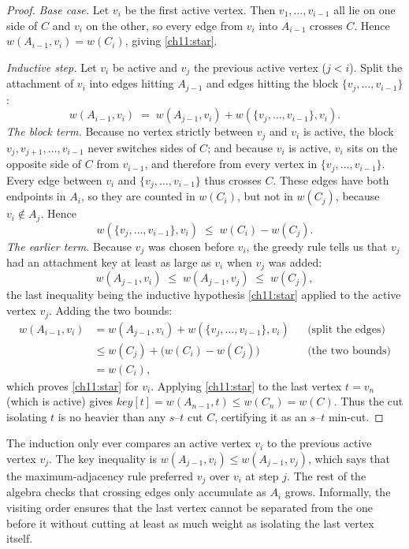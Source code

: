 \begin{proof}
\emph{Base case.} Let $v_i$ be the first active vertex. Then $v_1,\dots,v_{i-1}$ all lie on one side of $C$ and $v_i$ on the other, so every edge from $v_i$ into $A_{i-1}$ crosses $C$. Hence $w(A_{i-1},v_i)=w(C_i)$, giving \eqref{ch11:star}.

\emph{Inductive step.} Let $v_i$ be active and $v_j$ the previous active vertex ($j<i$). Split the attachment of $v_i$ into edges hitting $A_{j-1}$ and edges hitting the block $\{v_j,\dots,v_{i-1}\}$:
\[
  w(A_{i-1}, v_i) \;=\; w(A_{j-1}, v_i) + w(\{v_j,\dots,v_{i-1}\}, v_i).
\]
\emph{The block term.} Because no vertex strictly between $v_j$ and $v_i$ is active, the block $v_j,v_{j+1},\dots,v_{i-1}$ never switches sides of $C$; and because $v_i$ is active, $v_i$ sits on the opposite side of $C$ from $v_{i-1}$, and therefore from every vertex in $\{v_j,\dots,v_{i-1}\}$. Every edge between $v_i$ and $\{v_j,\dots,v_{i-1}\}$ thus crosses $C$. These edges have both endpoints in $A_i$, so they are counted in $w(C_i)$, but not in $w(C_j)$, because $v_i\notin A_j$. Hence
\[
  w(\{v_j,\dots,v_{i-1}\}, v_i) \;\le\; w(C_i)-w(C_j).
\]
\emph{The earlier term.} Because $v_j$ was chosen before $v_i$, the greedy rule tells us that $v_j$ had an attachment key at least as large as $v_i$ when $v_j$ was added:
\[
  w(A_{j-1}, v_i) \;\le\; w(A_{j-1}, v_j) \;\le\; w(C_j),
\]
the last inequality being the inductive hypothesis \eqref{ch11:star} applied to the active vertex $v_j$. Adding the two bounds:
\begin{align*}
  w(A_{i-1}, v_i) &= w(A_{j-1}, v_i) + w(\{v_j,\dots,v_{i-1}\}, v_i) && \text{(split the edges)}\\
                  &\le w(C_j) + \bigl(w(C_i)-w(C_j)\bigr) && \text{(the two bounds)}\\
                  &= w(C_i),
\end{align*}
which proves \eqref{ch11:star} for $v_i$. Applying \eqref{ch11:star} to the last vertex $t=v_n$ (which is active) gives $\textit{key}[t]=w(A_{n-1},t)\le w(C_n)=w(C)$. Thus the cut isolating $t$ is no heavier than any $s$--$t$ cut $C$, certifying it as an $s$--$t$ min-cut.
\end{proof}

\begin{whybox}
The induction only ever compares an active vertex $v_i$ to the previous active vertex $v_j$. The key inequality is $w(A_{j-1},v_i)\le w(A_{j-1},v_j)$, which says that the maximum-adjacency rule preferred $v_j$ over $v_i$ at step $j$. The rest of the algebra checks that crossing edges only accumulate as $A_i$ grows. Informally, the visiting order ensures that the last vertex cannot be separated from the one before it without cutting at least as much weight as isolating the last vertex itself.
\end{whybox}

